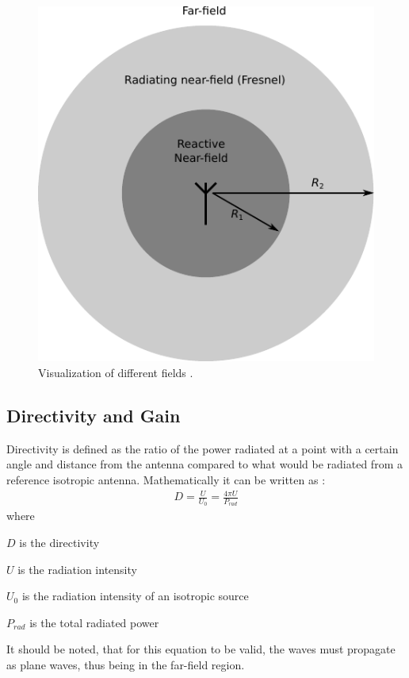 \begin{figure}[htbp]
  \centering
  \includegraphics[scale=1]{img/analysis/radiationfields}
  \caption{Visualization of different fields \cite{balanis2012antenna}.}
  \label{fig:field-regions}
\end{figure}

\subsection{Directivity and Gain}
\label{subsec:dir_gain}
Directivity is defined as the ratio of the power radiated at a  point with a certain angle and distance from the antenna compared to what would be radiated from a reference isotropic antenna. Mathematically it can be written as \cite{}: 
\begin{align}
  D = \frac{U}{U_0} = \frac{4 \pi U}{P_{rad}} 
\end{align}
where
\begin{where}
  \item[$D$] is the directivity
  \item[$U$] is the radiation intensity
  \item[$U_0$] is the radiation intensity of an isotropic source
  \item[$P_{rad}$] is the total radiated power 
\end{where}
It should be noted, that for this equation to be valid, the waves must propagate as plane waves, thus being in the far-field region.


